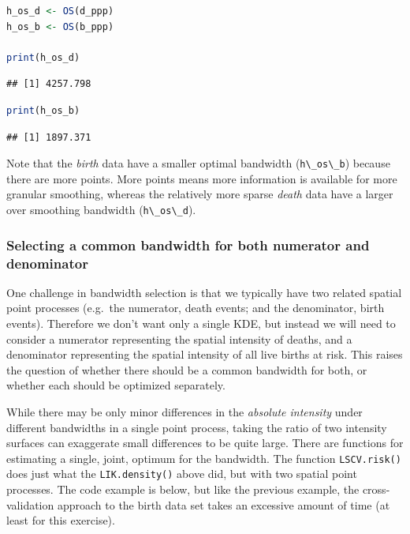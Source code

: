 \documentclass[
]{book}
\newcommand{\passthrough}[1]{#1}
\begin{document}
\begin{lstlisting}[language=R]
h_os_d <- OS(d_ppp)
h_os_b <- OS(b_ppp)

print(h_os_d)
\end{lstlisting}

\begin{lstlisting}
## [1] 4257.798
\end{lstlisting}

\begin{lstlisting}[language=R]
print(h_os_b)
\end{lstlisting}

\begin{lstlisting}
## [1] 1897.371
\end{lstlisting}

Note that the \emph{birth} data have a smaller optimal bandwidth (\passthrough{\lstinline!h\_os\_b!}) because there are more points. More points means more information is available for more granular smoothing, whereas the relatively more sparse \emph{death} data have a larger over smoothing bandwidth (\passthrough{\lstinline!h\_os\_d!}).

\hypertarget{selecting-a-common-bandwidth-for-both-numerator-and-denominator}{%
\subsubsection{Selecting a common bandwidth for both numerator and denominator}\label{selecting-a-common-bandwidth-for-both-numerator-and-denominator}}

One challenge in bandwidth selection is that we typically have two related spatial point processes (e.g.~the numerator, death events; and the denominator, birth events). Therefore we don't want only a single KDE, but instead we will need to consider a numerator representing the spatial intensity of deaths, and a denominator representing the spatial intensity of all live births at risk. This raises the question of whether there should be a common bandwidth for both, or whether each should be optimized separately.

While there may be only minor differences in the \emph{absolute intensity} under different bandwidths in a single point process, taking the ratio of two intensity surfaces can exaggerate small differences to be quite large. There are functions for estimating a single, joint, optimum for the bandwidth. The function \passthrough{\lstinline!LSCV.risk()!} does just what the \passthrough{\lstinline!LIK.density()!} above did, but with two spatial point processes. The code example is below, but like the previous example, the cross-validation approach to the birth data set takes an excessive amount of time (at least for this exercise).
\end{document}
